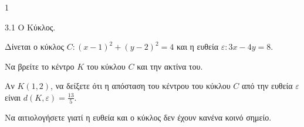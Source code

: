 \begin{ylh}{1}
    \item 3.1 Ο Κύκλος.
\end{ylh}
Δίνεται ο κύκλος $C: (x - 1)^2 + (y - 2)^2 = 4$ και η ευθεία $\varepsilon: 3x - 4y = 8$.
\begin{alist}
    \item Να βρείτε το κέντρο $K$ του κύκλου $C$ και την ακτίνα του. 
    \item Αν $K(1,2)$, να δείξετε ότι η απόσταση του κέντρου του κύκλου $C$ από την ευθεία $\varepsilon$ είναι $d(K,\varepsilon) = \frac{13}{5}$. 
    \item Να αιτιολογήσετε γιατί η ευθεία και ο κύκλος δεν έχουν κανένα κοινό σημείο. 
\end{alist}